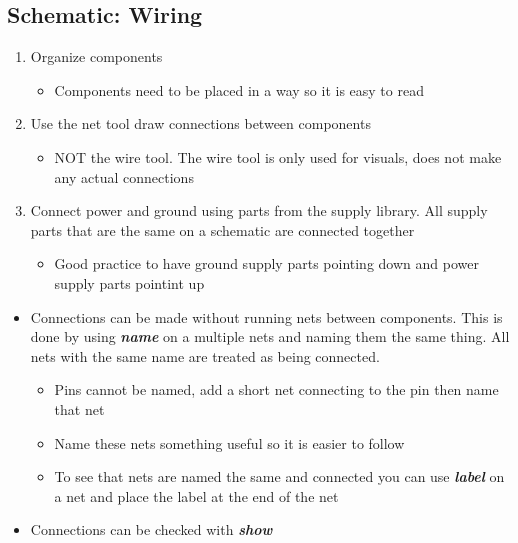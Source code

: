 \documentclass{article}
\begin{document}
\subsection{Schematic: Wiring}
\begin{enumerate}
    \item Organize components
    \begin{itemize}
        \item Components need to be placed in a way so it is easy to read
    \end{itemize}
    \item Use the net tool draw connections between components
    \begin{itemize}
        \item NOT the wire tool. The wire tool is only used for visuals, does
        not make any actual connections
    \end{itemize}
    \item Connect power and ground using parts from the supply library. All
    supply parts that are the same on a schematic are connected together
    \begin{itemize}
        \item Good practice to have ground supply parts pointing down and power
        supply parts pointint up
    \end{itemize}
\end{enumerate}
\begin{tcolorbox} [title=Tips \& Tricks]
    \begin{itemize}
        \item Connections can be made without running nets between components.
        This is done by using \textit{\textbf{name}} on a multiple nets and
        naming them the same thing. All nets with the same name are treated as
        being connected.
        \begin{itemize}
            \item Pins cannot be named, add a short net connecting to the pin
            then name that net
            \item Name these nets something useful so it is easier to follow
            \item To see that nets are named the same and connected you can use
            \textit{\textbf{label}} on a net and place the label at the end of
            the net
        \end{itemize}
        \item Connections can be checked with \textit{\textbf{show}}
    \end{itemize}
\end{tcolorbox}
\end{document}
